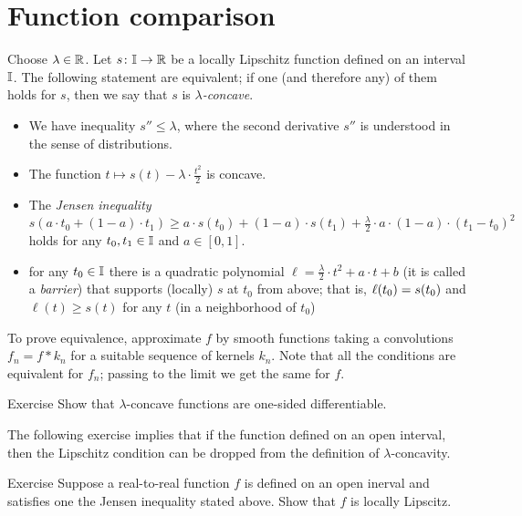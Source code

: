 \section{Function comparison}\label{Function comparison}

Choose $\lambda\in \mathbb{R}$.
Let $s\colon\mathbb{I}\to\mathbb{R}$ be a locally Lipschitz function defined on an interval $\mathbb{I}$.
The following statement are equivalent;
if one (and therefore any) of them holds for $s$, then we say that $s$ is \emph{$\lambda$-concave}.
\begin{itemize}
\item We have inequality $s''\le \lambda$, where the second derivative $s''$ is understood in the sense of distributions.
\item The function $t\mapsto s(t)-\lambda\cdot\tfrac{t^2}2$ is concave.
\item The \emph{Jensen inequality}
\[s(a\cdot t_0+(1-a)\cdot t_1)\ge a\cdot s(t_0)+(1-a)\cdot s(t_1)+\tfrac\lambda2\cdot a\cdot(1-a)\cdot(t_1-t_0)^2 \]
holds for any $t_0,t_1\in \mathbb{I}$ and $a\in[0,1]$.
\item for any $t_0\in \mathbb{I}$ there is a quadratic polynomial $\ell=\tfrac\lambda2\cdot t^2+a\cdot t+b$ (it is called a \emph{barrier}) that supports (locally) $s$ at $t_0$ from above;
that is, $\ell(t_0)= s(t_0)$ and $\ell(t)\ge s(t)$ for any $t$ (in a neighborhood of $t_0$)
\end{itemize}

To prove equivalence, approximate $f$ by smooth functions taking a convolutions $f_n=f*k_n$ for a suitable sequence of kernels $k_n$.
Note that all the conditions are equivalent for $f_n$;
passing to the limit we get the same for $f$.

\begin{thm}{Exercise}\label{ex:concave'}
Show that $\lambda$-concave functions are one-sided differentiable.
\end{thm}

The following exercise implies that if the function defined on an open interval, then the Lipschitz condition can be dropped from the definition of $\lambda$-concavity.

\begin{thm}{Exercise}\label{ex:concave-open}
Suppose a real-to-real function $f$ is defined on an open inerval and satisfies one the Jensen inequality stated above.
Show that $f$ is locally Lipscitz.
\end{thm}

